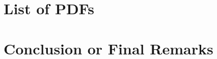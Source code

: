 \documentclass[10pt,letterpaper]{pdfannotations}
\begin{document}
\title{\MyTitle}
\author{\MyAuthor}
\date{\MyDate}

\maketitle

\renewcommand{\labelitemii}{$\square$}
\renewcommand{\labelitemiii}{$\ast$}

\pagestyle{empty}

\setcounter{secnumdepth}{0}
\tableofcontents
\newpage

\section{List of PDFs}
\listpdfs

\newpage

\section{\FirstSectionName}

\section{Conclusion or Final Remarks}

\end{document}
